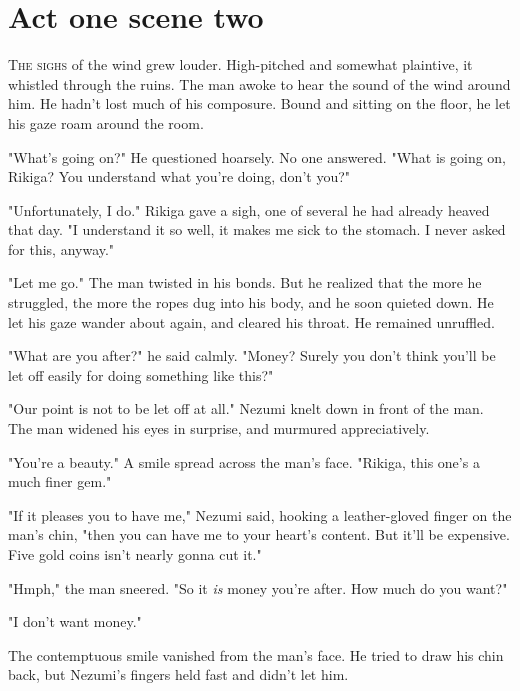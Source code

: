 
\chapter{Act one scene two}


\lettrine{T}{he sighs} of the wind grew louder. High-pitched and somewhat plaintive,
it whistled through the ruins. The man awoke to hear the sound of the
wind around him. He hadn't lost much of his composure. Bound and sitting
on the floor, he let his gaze roam around the room.

"What's going on?" He questioned hoarsely. No one answered. "What is
going on, Rikiga? You understand what you're doing, don't you?"

"Unfortunately, I do." Rikiga gave a sigh, one of several he had already
heaved that day. "I understand it so well, it makes me sick to the
stomach. I never asked for this, anyway."

"Let me go." The man twisted in his bonds. But he realized that the more
he struggled, the more the ropes dug into his body, and he soon quieted
down. He let his gaze wander about again, and cleared his throat. He
remained unruffled.

"What are you after?" he said calmly. "Money? Surely you don't think
you'll be let off easily for doing something like this?"

"Our point is not to be let off at all." Nezumi knelt down in front of
the man. The man widened his eyes in surprise, and murmured
appreciatively.

"You're a beauty." A smile spread across the man's face. "Rikiga, this
one's a much finer gem."

"If it pleases you to have me," Nezumi said, hooking a leather-gloved
finger on the man's chin, "then you can have me to your heart's content.
But it'll be expensive. Five gold coins isn't nearly gonna cut it."

"Hmph," the man sneered. "So it \emph{is} money you're after. How much do you
want?"

"I don't want money."

The contemptuous smile vanished from the man's face. He tried to draw
his chin back, but Nezumi's fingers held fast and didn't let him.

